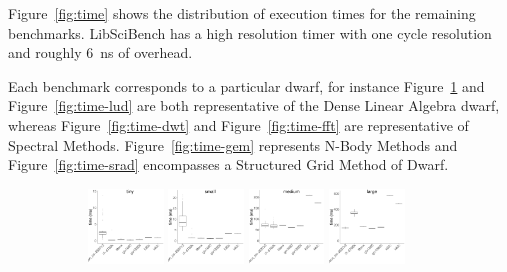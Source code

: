 \documentclass[../document.tex]{subfiles}
\begin{document}
Figure~\ref{fig:time} shows the distribution of execution times for the remaining benchmarks.
LibSciBench has a high resolution timer with one cycle resolution and roughly \SI{6}{\nano\second} of overhead.

Each benchmark corresponds to a particular dwarf, for instance Figure~\ref{fig:time-kmeans} and Figure~\ref{fig:time-lud} are both representative of the Dense Linear Algebra dwarf, whereas Figure~\ref{fig:time-dwt} and Figure~\ref{fig:time-fft} are representative of Spectral Methods.
Figure~\ref{fig:time-gem} represents N-Body Methods and Figure~\ref{fig:time-srad} encompasses a Structured Grid Method of Dwarf.

\captionsetup[subfigure]{justification=raggedright,singlelinecheck=false}

\begin{figure}
	\begin{subfigure}{0.09\textwidth} \label{fig:time-kmeans} \vspace{5mm}\end{subfigure}
	\begin{subfigure}{0.9\textwidth}
		\includegraphics[width=0.22\textwidth]{figures/time-results/generate_kmeans_no_knl_tiny_boxplot-1}
		\includegraphics[width=0.22\textwidth]{figures/time-results/generate_kmeans_no_knl_small_boxplot-1}
		\includegraphics[width=0.22\textwidth]{figures/time-results/generate_kmeans_no_knl_medium_boxplot-1}
		\includegraphics[width=0.22\textwidth]{figures/time-results/generate_kmeans_no_knl_large_boxplot-1}
	\end{subfigure}


\end{figure}
\end{document}
